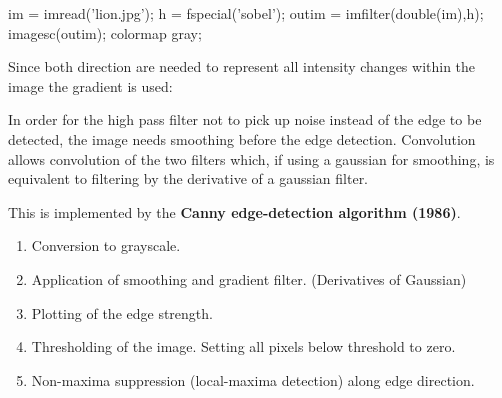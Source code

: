 \documentclass[10pt,a4paper]{scrartcl}
\begin{document}
\begin{multicols*}{2}

\begin{TPMatlab}
im = imread('lion.jpg');
h = fspecial('sobel');
outim = imfilter(double(im),h);
imagesc(outim);
colormap gray;
\end{TPMatlab}

Since both direction are needed to represent all intensity changes within the image the gradient is used:




In order for the high pass filter not to pick up noise instead of the edge to be detected, the image needs smoothing before the edge detection. Convolution allows convolution of the two filters which, if using a gaussian for smoothing, is equivalent to filtering by the derivative of a gaussian filter.

\vspace{3ex}

This is implemented by the \textbf{Canny edge-detection algorithm (1986)}.

\begin{enumerate}
\item Conversion to grayscale.
\item Application of smoothing and gradient filter. (Derivatives of Gaussian)
\item Plotting of the edge strength.
\item Thresholding of the image. Setting all pixels below threshold to zero.
\item Non-maxima suppression (local-maxima detection) along edge direction.
\end{enumerate}


\end{multicols*}
\end{document}
